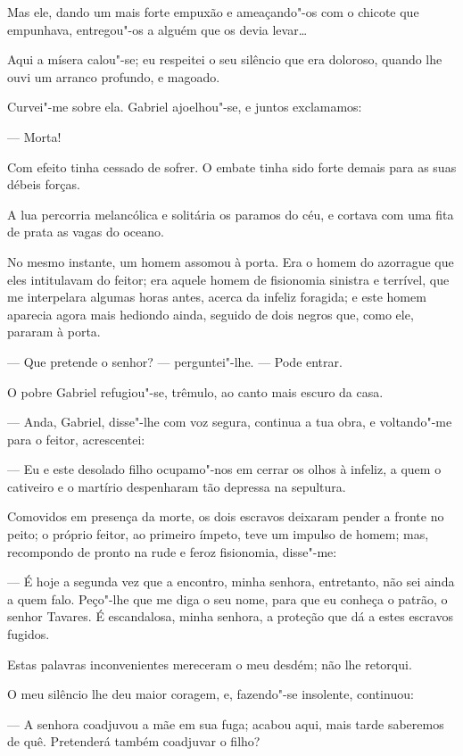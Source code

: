 Mas ele, dando um mais forte empuxão e ameaçando"-os com o chicote que
empunhava, entregou"-os a alguém que os devia levar\ldots{}

Aqui a mísera calou"-se; eu respeitei o seu silêncio que era doloroso,
quando lhe ouvi um arranco profundo, e magoado.

Curvei"-me sobre ela. Gabriel ajoelhou"-se, e juntos exclamamos:

--- Morta!

Com efeito tinha cessado de sofrer. O embate tinha sido forte demais
para as suas débeis forças.

A lua percorria melancólica e solitária os paramos do céu, e cortava com
uma fita de prata as vagas do oceano.

No mesmo instante, um homem assomou à porta. Era o homem do azorrague
que eles intitulavam do feitor; era aquele homem de fisionomia sinistra
e terrível, que me interpelara algumas horas antes, acerca da infeliz
foragida; e este homem aparecia agora mais hediondo ainda, seguido de
dois negros que, como ele, pararam à porta.

--- Que pretende o senhor? --- perguntei"-lhe. --- Pode entrar.

O pobre Gabriel refugiou"-se, trêmulo, ao canto mais escuro da casa.

--- Anda, Gabriel, disse"-lhe com voz segura, continua a tua obra, e
voltando"-me para o feitor, acrescentei:

--- Eu e este desolado filho ocupamo"-nos em cerrar os olhos à infeliz, a
quem o cativeiro e o martírio despenharam tão depressa na sepultura.

Comovidos em presença da morte, os dois escravos deixaram pender a
fronte no peito; o próprio feitor, ao primeiro ímpeto, teve um impulso
de homem; mas, recompondo de pronto na rude e feroz fisionomia,
disse"-me:

--- É hoje a segunda vez que a encontro, minha senhora, entretanto, não
sei ainda a quem falo. Peço"-lhe que me diga o seu nome, para que eu
conheça o patrão, o senhor Tavares. É escandalosa, minha senhora, a
proteção que dá a estes escravos fugidos.

Estas palavras inconvenientes mereceram o meu desdém; não lhe retorqui.

O meu silêncio lhe deu maior coragem, e, fazendo"-se insolente,
continuou:

--- A senhora coadjuvou a mãe em sua fuga; acabou aqui, mais tarde
saberemos de quê. Pretenderá também coadjuvar o filho?

